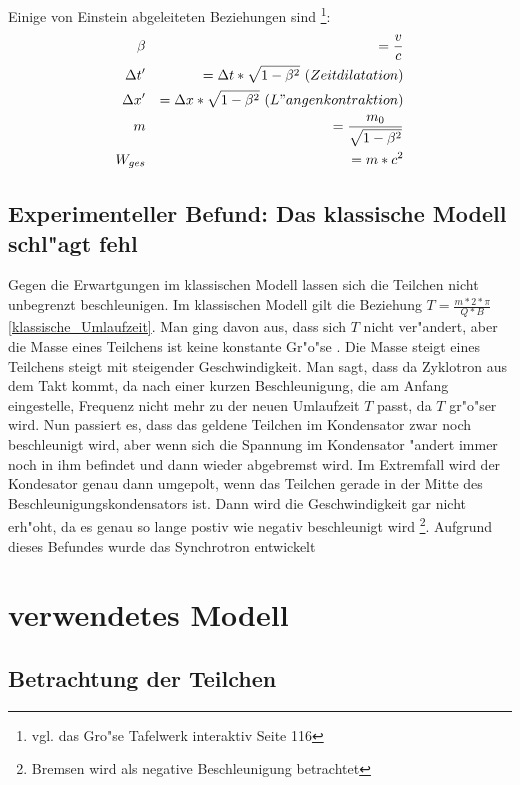 \documentclass[14pt, a4paper]{report}
\begin{document}
Einige von Einstein abgeleiteten Beziehungen sind 
\footnote{vgl. das Gro"se Tafelwerk interaktiv Seite 116 }:
\begin{eqnarray}
\beta && = \frac{v}{c} \\
\Delta t' && = \Delta t * \sqrt{1 - \beta^2} ~ (Zeitdilatation) \\
\Delta x' && = \Delta x * \sqrt{1 - \beta^2} ~ (L"angenkontraktion) \\
m && = \frac{m_0}{\sqrt{1 - \beta^2}} \label{var_m} \\
W_{ges} && = m * c^2 
\end{eqnarray}

\section{Experimenteller Befund: Das klassische Modell schl"agt fehl}
Gegen die Erwartgungen im klassischen Modell 
lassen sich die Teilchen nicht unbegrenzt beschleunigen. Im klassischen Modell
gilt die Beziehung $T = \frac{m * 2 * \pi }{Q * B}$ \ref{klassische_Umlaufzeit}. 
Man ging davon aus, dass sich $T$ nicht ver"andert, aber die Masse eines Teilchens
ist keine konstante Gr"o"se . Die Masse steigt eines
Teilchens steigt mit steigender Geschwindigkeit. Man sagt, dass da Zyklotron aus dem 
Takt kommt, da nach einer kurzen Beschleunigung, die am Anfang eingestelle, Frequenz
nicht mehr zu der neuen Umlaufzeit $T$ passt, da $T$ gr"o"ser wird. Nun passiert es,
dass das geldene Teilchen im Kondensator zwar noch beschleunigt wird, aber wenn sich die
Spannung im Kondensator "andert immer noch in ihm befindet und dann wieder abgebremst
wird. Im Extremfall wird der Kondesator genau dann umgepolt, wenn das Teilchen gerade
in der Mitte des Beschleunigungskondensators ist. Dann wird die Geschwindigkeit gar 
nicht erh"oht, da es genau so lange postiv wie negativ beschleunigt wird 
\footnote{Bremsen wird als negative Beschleunigung betrachtet}.
Aufgrund dieses Befundes wurde das Synchrotron entwickelt 

\chapter{verwendetes Modell}
\section{Betrachtung der Teilchen}
\end{document}
